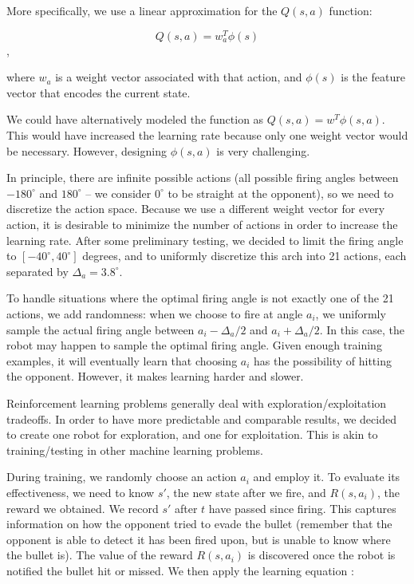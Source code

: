 \documentclass{article}
\theoremstyle{plain}
\theoremstyle{definition}
\theoremstyle{remark}
\begin{document}
More specifically, we use a linear approximation for the $Q(s, a)$ function:

$$Q(s, a) = w_a^T\phi(s)$$,

where $w_a$ is a weight vector associated with that action, and $\phi(s)$ is the feature vector that encodes the current state.

We could have alternatively modeled the function as $Q(s,a) = w^T\phi(s, a)$. This would have increased the learning rate because only
one weight vector would be necessary. However, designing $\phi(s, a)$ is very challenging.

In principle, there are infinite possible actions (all possible firing angles between $-180^{\circ} $ and $180^{\circ} $ -- we consider $0^{\circ}$ to be straight at the opponent),
so we need to discretize the
action space. Because we use a different weight vector for every action, it is desirable to minimize the number of actions in order
to increase the learning rate. After some preliminary testing, we decided to limit the firing angle to $[-40^{\circ}, 40^{\circ}]$ degrees, and to uniformly discretize this arch into
21 actions, each separated by $\Delta_a = 3.8^{\circ}$.

To handle situations where the optimal firing angle is not exactly one of the 21 actions, we add randomness: when we choose to fire at angle $a_i$, we uniformly sample the actual
firing angle between $a_i - \Delta_a/2$ and $a_i + \Delta_a/2$. In this case, the robot may happen to sample the optimal firing angle. Given enough training examples, it will
eventually learn that choosing $a_i$ has the possibility of hitting the opponent. However, it makes learning harder and slower.

Reinforcement learning problems generally deal with exploration/exploitation tradeoffs. In order to have more predictable and comparable results, we decided to
create one robot for exploration, and one for exploitation. This is akin to training/testing in other machine learning problems.

During training, we randomly choose an action $a_i$ and employ it. To evaluate its effectiveness, we need to know $s'$, the new state after we fire,
and $R(s, a_i)$, the reward we obtained. We record $s'$ after $t$ have passed since firing. This captures information on
how the opponent tried to evade the bullet (remember that the opponent is able to detect it has been fired upon, but is unable to know where the bullet is).
The value of the reward $R(s, a_i)$ is discovered once the robot is notified the bullet hit or missed. We then apply the learning equation \cite{russelnorvig}:
\end{document}
